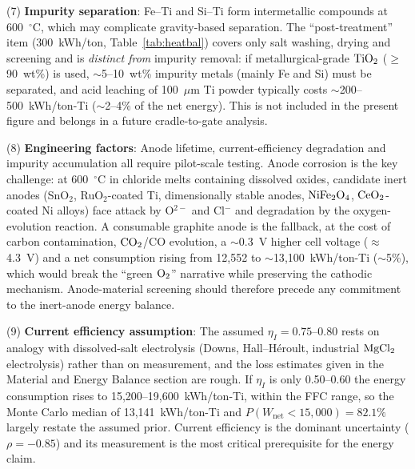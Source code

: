 \documentclass[11pt]{article}
\begin{document}
(7) \textbf{Impurity separation}: Fe--Ti and Si--Ti form intermetallic compounds at 600~$^{\circ}$C, which may complicate gravity-based separation. The ``post-treatment'' item (300~kWh/ton, Table~\ref{tab:heatbal}) covers only salt washing, drying and screening and is \emph{distinct from} impurity removal: if metallurgical-grade $\ce{TiO2}$ ($\geq$90~wt\%) is used, $\sim$5--10~wt\% impurity metals (mainly Fe and Si) must be separated, and acid leaching of 100~$\mu$m Ti powder typically costs $\sim$200--500~kWh/ton-Ti ($\sim$2--4\% of the net energy). This is not included in the present figure and belongs in a future cradle-to-gate analysis.

(8) \textbf{Engineering factors}: Anode lifetime, current-efficiency degradation and impurity accumulation all require pilot-scale testing. Anode corrosion is the key challenge: at 600~$^{\circ}$C in chloride melts containing dissolved oxides, candidate inert anodes (SnO$_2$, RuO$_2$-coated Ti, dimensionally stable anodes, $\ce{NiFe2O4}$, $\ce{CeO2}$-coated Ni alloys) face attack by O$^{2-}$ and Cl$^-$ and degradation by the oxygen-evolution reaction. A consumable graphite anode is the fallback, at the cost of carbon contamination, $\ce{CO2}$/CO evolution, a $\sim$0.3~V higher cell voltage ($\approx$4.3~V) and a net consumption rising from 12{,}552 to $\sim$13{,}100~kWh/ton-Ti ($\sim$5\%), which would break the ``green $\ce{O2}$'' narrative while preserving the cathodic mechanism. Anode-material screening should therefore precede any commitment to the inert-anode energy balance.

(9) \textbf{Current efficiency assumption}: The assumed $\eta_I = 0.75$--0.80 rests on analogy with dissolved-salt electrolysis (Downs, Hall--H\'eroult, industrial $\ce{MgCl2}$ electrolysis) rather than on measurement, and the loss estimates given in the Material and Energy Balance section are rough. If $\eta_I$ is only 0.50--0.60 the energy consumption rises to 15{,}200--19{,}600~kWh/ton-Ti, within the FFC range, so the Monte Carlo median of 13{,}141~kWh/ton-Ti and $P(W_{\mathrm{net}} < 15{,}000) = 82.1\%$ largely restate the assumed prior. Current efficiency is the dominant uncertainty ($\rho = -0.85$) and its measurement is the most critical prerequisite for the energy claim.
\end{document}
